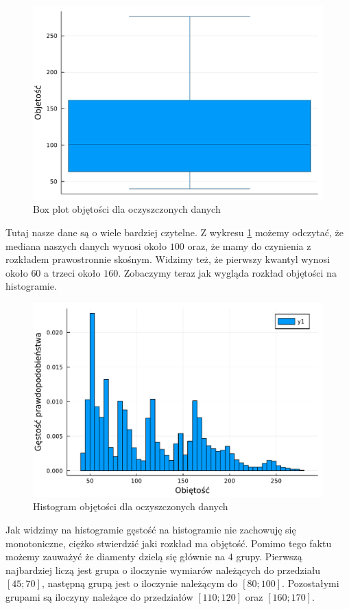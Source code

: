 \documentclass[12pt,leqno]{article}
\theoremstyle{exer}
\begin{document}
	\begin{figure}[H]
		\centering
		\includegraphics[width=4\columnwidth/5]{images/boxplot_V_danych_oczyszczonych.pdf}
		\caption{Box plot objętości dla oczyszczonych danych}
		\label{fig:box_V}
	\end{figure}
	Tutaj nasze dane są o wiele bardziej czytelne. Z wykresu \ref{fig:box_V} możemy odczytać, że mediana naszych danych wynosi około $100$ oraz, że mamy do czynienia z rozkładem prawostronnie skośnym. Widzimy też, że pierwszy kwantyl wynosi około $60$ a trzeci około $160$.
	Zobaczymy teraz jak wygląda rozkład objętości na histogramie.
	\begin{figure}[H]
		\centering
		\includegraphics[width=4\columnwidth/5]{images/histogram_V.pdf}
		\caption{Histogram objętości dla oczyszczonych danych}
		\label{fig:hist_V}
	\end{figure}
	Jak widzimy na histogramie gęstość na histogramie nie zachowuję się monotoniczne, ciężko stwierdzić jaki rozkład ma objętość. Pomimo tego faktu możemy zauważyć że diamenty dzielą się głównie na $4$ grupy. Pierwszą najbardziej liczą jest grupa o iloczynie wymiarów należących do przedziału $[45;70] $, następną grupą jest o iloczynie należącym do $[80;100]$. Pozostałymi grupami są iloczyny należące do przedziałów $[110;120]$ oraz $[160;170]$.
	
\end{document}
